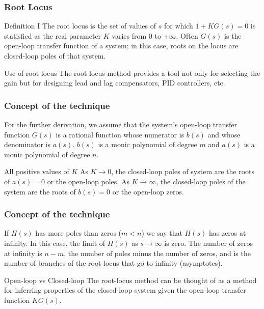 \begin{frame}
\frametitle{Root Locus}
	\begin{block}{Definition I}
		The root locus is the set of values of $s$ for which $1 + KG(s) = 0$ is statisfied as the real parameter $K$ varies from $0$ to $+\infty$. Often $G(s)$ is the open-loop transfer function of a system; in this case, roots on the locus are closed-loop poles of that system.
	\end{block}
	\begin{block}{Use of root locus}
		The root locus method provides a tool not only for selecting the gain but for designing lead and lag compensators, PID controllers, etc.
	\end{block}
\end{frame}

\begin{frame}
\frametitle{Concept of the technique}
\justify
	For the further derivation, we assume that the system's open-loop transfer function $G(s)$ is a rational function whose numerator is $b(s)$ and whose denominator is $a(s)$. $b(s)$ is a monic polynomial of degree $m$ and $a(s)$ is a monic polynomial of degree $n$. 
	\vspace{1em}
	\begin{block}{All positive values of $K$}
		As $K \rightarrow 0$, the closed-loop poles of system are the roots of $a(s) = 0$ or the open-loop poles. As $K \rightarrow \infty$, the closed-loop poles of the system are the roots of $b(s) = 0$ or the open-loop zeros.
	\end{block}
\end{frame}

\begin{frame}
\frametitle{Concept of the technique}
\justify
	If $H(s)$ has more poles than zeros ($m < n$) we say that $H(s)$ has zeros at infinity. In this case, the limit of $H(s)$ as $s \rightarrow \infty$ is zero. The number of zeros at infinity is $n-m$, the number of poles minus the number of zeros, and is the number of branches of the root locus that go to infinity (asymptotes).
	
	\begin{alertblock}{Open-loop vs Closed-loop}
		The root-locus method can be thought of as a method for inferring properties of the closed-loop system given the open-loop transfer function $KG(s)$.
	\end{alertblock}
\end{frame}

